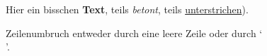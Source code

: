 Hier ein bisschen
\textbf{Text},
teils \emph{betont},
teils \underline
{unterstrichen}).

Zeilenumbruch entweder
durch eine leere Zeile
oder durch `\\'.

